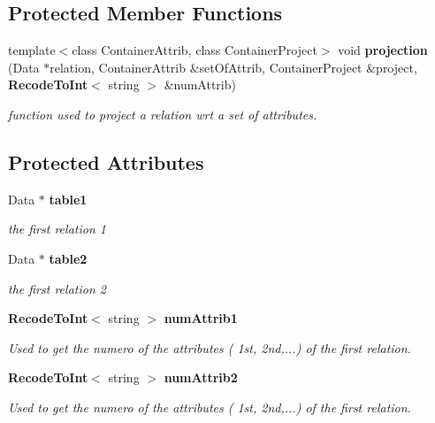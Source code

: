 \subsection*{Protected Member Functions}
\begin{CompactItemize}
\item 
template$<$class Container\-Attrib, class Container\-Project$>$ void {\bf projection} (Data $\ast$relation, Container\-Attrib \&set\-Of\-Attrib, Container\-Project \&project, {\bf Recode\-To\-Int}$<$ string $>$ \&num\-Attrib)
\begin{CompactList}\small\item\em function used to project a relation wrt a set of attributes. \item\end{CompactList}\end{CompactItemize}
\subsection*{Protected Attributes}
\begin{CompactItemize}
\item 
Data $\ast$ {\bf table1}\label{class_satisfied_d_i_33f03c2c7d794f2c57f5702d31ff0a6e}

\begin{CompactList}\small\item\em the first relation 1 \item\end{CompactList}\item 
Data $\ast$ {\bf table2}\label{class_satisfied_d_i_06b1c1121dd6f8c006aab3d9960d7c8c}

\begin{CompactList}\small\item\em the first relation 2 \item\end{CompactList}\item 
{\bf Recode\-To\-Int}$<$ string $>$ {\bf num\-Attrib1}\label{class_satisfied_d_i_da548f7b628be78a89fddb160093ff82}

\begin{CompactList}\small\item\em Used to get the numero of the attributes ( 1st, 2nd,...) of the first relation. \item\end{CompactList}\item 
{\bf Recode\-To\-Int}$<$ string $>$ {\bf num\-Attrib2}\label{class_satisfied_d_i_e02512f1947af238a5aa185bb85284e6}

\begin{CompactList}\small\item\em Used to get the numero of the attributes ( 1st, 2nd,...) of the first relation. \item\end{CompactList}\end{CompactItemize}
